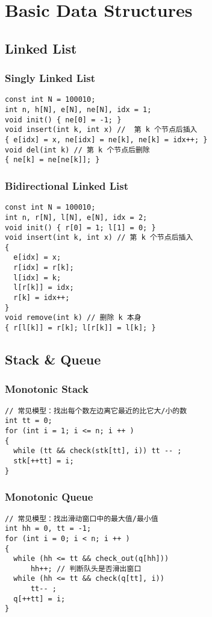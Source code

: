 \chapter{Basic Data Structures}\label{chap:BasicDaraStructures}
\section{Linked List}
\subsection{Singly Linked List}
\begin{lstlisting}
const int N = 100010;
int n, h[N], e[N], ne[N], idx = 1;
void init() { ne[0] = -1; }
void insert(int k, int x) //  第 k 个节点后插入
{ e[idx] = x, ne[idx] = ne[k], ne[k] = idx++; }
void del(int k) // 第 k 个节点后删除
{ ne[k] = ne[ne[k]]; }
\end{lstlisting}
\subsection{Bidirectional Linked List}
\begin{lstlisting}
const int N = 100010;
int n, r[N], l[N], e[N], idx = 2;
void init() { r[0] = 1; l[1] = 0; }
void insert(int k, int x) // 第 k 个节点后插入
{
  e[idx] = x;
  r[idx] = r[k];
  l[idx] = k;
  l[r[k]] = idx;
  r[k] = idx++;
}
void remove(int k) // 删除 k 本身
{ r[l[k]] = r[k]; l[r[k]] = l[k]; }
\end{lstlisting}
\section{Stack \& Queue}
\subsection{Monotonic Stack}
\begin{lstlisting}
// 常见模型：找出每个数左边离它最近的比它大/小的数
int tt = 0;
for (int i = 1; i <= n; i ++ )
{
  while (tt && check(stk[tt], i)) tt -- ;
  stk[++tt] = i;
}
\end{lstlisting}
\subsection{Monotonic Queue}
\begin{lstlisting}
// 常见模型：找出滑动窗口中的最大值/最小值
int hh = 0, tt = -1;
for (int i = 0; i < n; i ++ )
{
  while (hh <= tt && check_out(q[hh]))
      hh++; // 判断队头是否滑出窗口
  while (hh <= tt && check(q[tt], i))
      tt-- ;
  q[++tt] = i;
}
\end{lstlisting}
